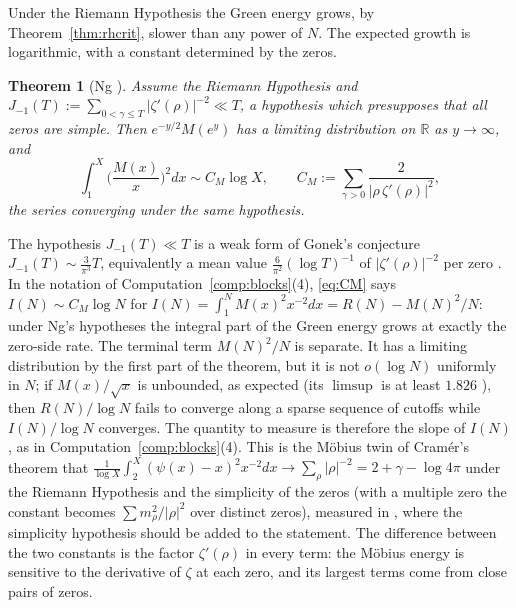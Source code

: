 \documentclass[11pt]{article}
\newtheorem{theorem}{Theorem}[section]
\theoremstyle{definition}
\theoremstyle{remark}
\newcommand{\R}{\mathbb{R}}
\begin{document}
Under the Riemann Hypothesis the Green energy grows, by Theorem~\ref{thm:rhcrit}, slower than any power of $N$. The expected growth is logarithmic, with a constant determined by the zeros.

\begin{theorem}[Ng {\cite[Theorems 2 and 3]{ng}}]\label{thm:ng}
Assume the Riemann Hypothesis and $J_{-1}(T):=\sum_{0<\gamma\le T}|\zeta'(\rho)|^{-2}\ll T$, a hypothesis which presupposes that all zeros are simple. Then $e^{-y/2}M(e^y)$ has a limiting distribution on $\R$ as $y\to\infty$, and
\begin{equation}\label{eq:CM}
\int_1^X\Big(\frac{M(x)}{x}\Big)^2dx\sim C_M\log X,\qquad C_M:=\sum_{\gamma>0}\frac{2}{|\rho\,\zeta'(\rho)|^2},
\end{equation}
the series converging under the same hypothesis.
\end{theorem}

The hypothesis $J_{-1}(T)\ll T$ is a weak form of Gonek's conjecture $J_{-1}(T)\sim\frac3{\pi^3}T$, equivalently a mean value $\frac{6}{\pi^2}(\log T)^{-1}$ of $|\zeta'(\rho)|^{-2}$ per zero \cite{ng,gonek}. In the notation of Computation~\ref{comp:blocks}(4), \eqref{eq:CM} says $I(N)\sim C_M\log N$ for $I(N)=\int_1^N M(x)^2x^{-2}dx=R(N)-M(N)^2/N$: under Ng's hypotheses the integral part of the Green energy grows at exactly the zero-side rate. The terminal term $M(N)^2/N$ is separate. It has a limiting distribution by the first part of the theorem, but it is not $o(\log N)$ uniformly in $N$; if $M(x)/\sqrt x$ is unbounded, as expected (its $\limsup$ is at least $1.826$ \cite{hurst}), then $R(N)/\log N$ fails to converge along a sparse sequence of cutoffs while $I(N)/\log N$ converges. The quantity to measure is therefore the slope of $I(N)$, as in Computation~\ref{comp:blocks}(4). This is the M\"obius twin of Cram\'er's theorem that $\frac1{\log X}\int_2^X(\psi(x)-x)^2x^{-2}dx\to\sum_\rho|\rho|^{-2}=2+\gamma-\log4\pi$ under the Riemann Hypothesis and the simplicity of the zeros \cite{cramer} (with a multiple zero the constant becomes $\sum m_\rho^2/|\rho|^2$ over distinct zeros), measured in \cite[Computation 13.3]{michaels-folds}, where the simplicity hypothesis should be added to the statement. The difference between the two constants is the factor $\zeta'(\rho)$ in every term: the M\"obius energy is sensitive to the derivative of $\zeta$ at each zero, and its largest terms come from close pairs of zeros.
\end{document}
